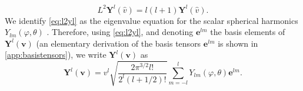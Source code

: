 %
\begin{equation}
    L^2 \mathbf Y^l(\hat v) = l(l+1) \mathbf Y^l(\hat v).
\label{eq:l2yl}
\end{equation}
%
We identify \cref{eq:l2yl} as the eigenvalue equation for the scalar spherical harmonics $Y_{lm}(\varphi, \theta)$ \citep{Arfken2013}.
%
Therefore, using \cref{eq:l2yl}, and denoting $\mathbf e^{l m}$  the basis elements of $\mathbf Y^l(\mathbf v)$ (an elementary derivation of the basis tensors $\mathbf e^{l m}$ is shown in \cref{app:basistensors}), we write $\mathbf Y^{l}(\mathbf v)$ as
%
\begin{equation}
    \mathbf Y^{l}(\mathbf v) = v^l \sqrt{\frac{ 2 \pi^{3/2}  l!}{2^l (l+1/2)!}}\sum_{m=-l}^lY_{lm}(\varphi,\theta)\mathbf e^{l m}.
\label{eq:ylvfull}
\end{equation}

